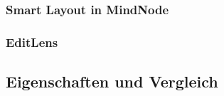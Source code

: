\subsubsection{Smart Layout in MindNode}


\subsubsection{EditLens}


\subsection{Eigenschaften und Vergleich}













